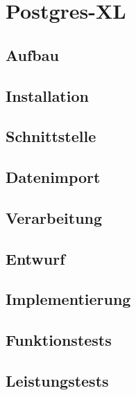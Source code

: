 \chapter{Postgres-XL}
\label{chapter:postgresxl}

\section{Aufbau}

\section{Installation}

\section{Schnittstelle}

\section{Datenimport}

\section{Verarbeitung}

\section{Entwurf}

\section{Implementierung}

\section{Funktionstests}

\section{Leistungstests}
